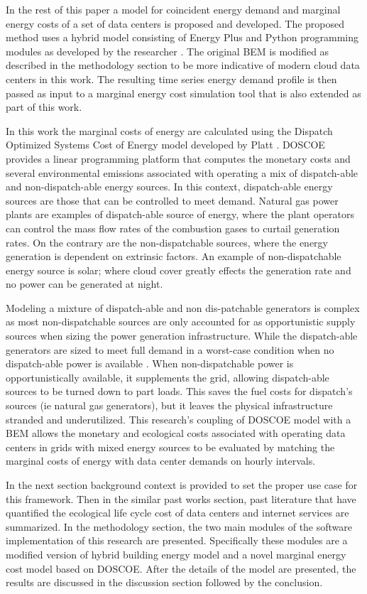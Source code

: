 In the rest of this paper a model for coincident energy demand and marginal energy costs of a set of data centers is proposed and developed. The proposed method uses a hybrid model consisting of Energy Plus and Python programming modules as developed by the researcher \cite{kumar20}. The original BEM is modified as described in the methodology section to be more indicative of modern cloud data centers in this work. The resulting time series energy demand profile is then passed as input to a marginal energy cost simulation tool that is also extended as part of this work.

In this work the marginal costs of energy are calculated using the Dispatch Optimized Systems Cost of Energy model developed by Platt \cite{platt17}. DOSCOE provides a linear programming platform that computes the monetary costs and several environmental emissions associated with operating a mix of dispatch-able and non-dispatch-able energy sources. In this context, dispatch-able energy sources are those that can be controlled to meet demand. Natural gas power plants are examples of dispatch-able source of energy, where the plant operators can control the mass flow rates of the combustion gases to curtail generation rates. On the contrary are the non-dispatchable sources, where the energy generation is dependent on extrinsic factors. An example of non-dispatchable energy source is solar; where cloud cover greatly effects the generation rate and no power can be generated at night.

Modeling a mixture of dispatch-able and non dis-patchable generators is complex as most non-dispatchable sources are only accounted for as opportunistic supply sources when sizing the power generation infrastructure. While the dispatch-able generators are sized to meet full demand in a worst-case condition when no dispatch-able power is available \cite{platt17}. When non-dispatchable power is opportunistically available, it supplements the grid, allowing dispatch-able sources to be turned down to part loads. This saves the fuel costs for dispatch's sources (ie natural gas generators), but it leaves the physical infrastructure stranded and underutilized. This research’s coupling of DOSCOE model with a BEM allows the monetary and ecological costs associated with operating data centers in grids with mixed energy sources to be evaluated by matching the marginal costs of energy with data center demands on hourly intervals.

In the next section background context is provided to set the proper use case for this framework. Then in the similar past works section, past literature that have quantified the ecological life cycle cost of data centers and internet services are summarized. In the methodology section, the two main modules of the software implementation of this research are presented. Specifically these modules are a modified version of hybrid building energy model and a novel marginal energy cost model based on DOSCOE. After the details of the model are presented, the results are discussed in the discussion section followed by the conclusion.


